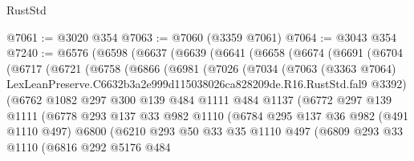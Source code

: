 \begin{lexlean}{RustStd}
\begin{coremodule}
@7061 := @3020 @354
@7063 := @7060 (@3359 @7061)
@7064 := @3043 @354
@7240 := @6576
    (@6598
      (@6637
        (@6639
          (@6641
            (@6658
              (@6674
                (@6691
                  (@6704
                    (@6717
                      (@6721
                        (@6758
                          (@6866
                            (@6981
                              (@7026
                                (@7034
                                  (@7063
                                    (@3363 @7064)
                                    LexLeanPreserve.C6632b3a2e999d115038026ca828209de.R16.RustStd.fal9
                                    @3392)
                                  (@6762
                                    @1082
                                    @297
                                    @300
                                    @139
                                    @484
                                    @1111
                                    @484
                                    @1137
                                    (@6772
                                      @297
                                      @139
                                      @1111
                                      (@6778
                                        @293
                                        @137
                                        @33
                                        @982
                                        @1110
                                        (@6784
                                          @295
                                          @137
                                          @36
                                          @982
                                          (@491 @1110 @497)
                                          @6800
                                          (@6210
                                            @293
                                            @50
                                            @33
                                            @35
                                            @1110
                                            @497
                                            (@6809
                                              @293
                                              @33
                                              @1110
                                              (@6816
                                                @292
                                                @5176
                                                @484

\end{coremodule}
\end{lexlean}
